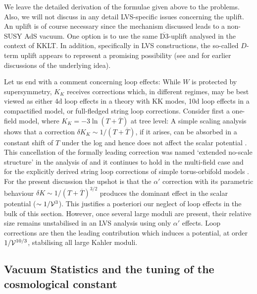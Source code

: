 \documentclass[12pt]{article}
\newcommand{\ol}{\overline}
\numberwithin{equation}{section}
\begin{document}
We leave the detailed derivation of the formulae given above to the problems. Also, we will not discuss in any detail LVS-specific issues concerning the uplift. An uplift is of course necessary since the mechanism discussed leads to a non-SUSY AdS vacuum. One option is to use the same $\overline{\mbox{D3}}$-uplift analysed in the context of KKLT. In addition, specifically in LVS constructions, the so-called $D$-term uplift appears to represent a promising possibility (see \cite{Cremades:2007ig} and \cite{Burgess:2003ic, Villadoro:2005yq} for earlier discussions of the underlying idea).

Let us end with a comment concerning loop effects: While $W$ is protected by supersymmetry, $K_K$ receives corrections which, in different regimes, may be best viewed as either 4d loop effects in a theory with KK modes, 10d loop effects in a compactified model, or full-fledged string loop corrections. Consider first a one-field model, where $K_K=-3\ln(T+\ol{T})$ at tree level: A simple scaling analysis shows that a correction $\delta K_K\sim 1/(T+\ol{T})$, if it arises, can be absorbed in a constant shift of $T$ under the log and hence does not affect the scalar potential \cite{vonGersdorff:2005bf}. This cancellation of the formally leading correction was named `extended no-scale structure' in the analysis of \cite{Cicoli:2007xp} and it continues to hold in the multi-field case \cite{Berg:2007wt} and for the explicitly derived string loop corrections of simple torus-orbifold models \cite{Berg:2005ja}. For the present discussion the upshot is that the $\alpha'$ correction with its parametric behaviour $\delta K\sim 1/(T+\ol{T})^{3/2}$ produces the dominant effect in the scalar potential ($\sim 1/{\cal V}^3$). This justifies a posteriori our neglect of loop effects in the bulk of this section. However, once several large moduli are present, their relative size remains unstabilised in an LVS analysis using only $\alpha'$ effects. Loop corrections are then the leading contribution which induces a potential, at order $1/{\cal V}^{10/3}$, stabilising all large Kahler moduli.






\subsection{Vacuum Statistics and the tuning of the cosmological constant}
\end{document}
